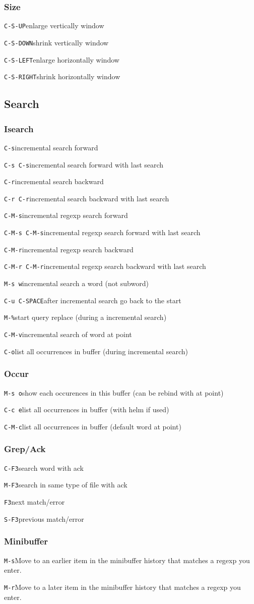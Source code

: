 \documentclass[10pt,landscape]{article}
\def\cm#1#2{{\tt#1}\dotfill#2\par}
\begin{document}
\begin{multicols}{3}
\subsubsection{Size}
\cm{C-S-UP}{enlarge vertically window}
\cm{C-S-DOWN}{shrink vertically window}
\cm{C-S-LEFT}{enlarge horizontally window}
\cm{C-S-RIGHT}{shrink horizontally window}

\subsection{Search}

\subsubsection{Isearch}
\cm{C-s}{incremental search forward}
\cm{C-s C-s}{incremental search forward with last search}
\cm{C-r}{incremental search backward}
\cm{C-r C-r}{incremental search backward with last search}
\cm{C-M-s}{incremental regexp search forward}
\cm{C-M-s C-M-s}{incremental regexp search forward with last search}
\cm{C-M-r}{incremental regexp search backward}
\cm{C-M-r C-M-r}{incremental regexp search backward with last search}
\cm{M-s w}{incremental search a word (not subword)}
\cm{C-u C-SPACE}{after incremental search go back to the start}
\cm{M-\%}{start query replace (during a incremental search)}
\cm{C-M-v}{incremental search of word at point}
\cm{C-o}{list all occurrences in buffer (during incremental search)}

\subsubsection{Occur}
\cm{M-s o}{show each occurences in this buffer (can be rebind with at point)}
\cm{C-c e}{list all occurrences in buffer (with helm if used)}
\cm{C-M-c}{list all occurrences in buffer (default word at point)}

\subsubsection{Grep/Ack}
\cm{C-F3}{search word with ack}
\cm{M-F3}{search in same type of file with ack}
\cm{F3}{next match/error}
\cm{S-F3}{previous match/error}

\subsubsection{Minibuffer}
\cm{M-s}{Move to an earlier item in the minibuffer history that matches a regexp you enter.}
\cm{M-r}{Move to a later item in the minibuffer history that matches a regexp you enter.}


\end{multicols}
\end{document}
